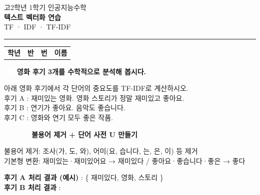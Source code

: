 \documentclass[a4paper,11pt]{article}
\begin{document}
\begin{center}
{\small\color{gray} 고2학년 1학기 인공지능수학}
\\[2mm]
{\LARGE\bfseries 텍스트 벡터화 연습}
\\[1mm]
{\normalsize\color{gray} TF · IDF · TF-IDF}
\end{center}
\vspace{-2mm}
\noindent\rule{\linewidth}{0.8pt}
\vspace{1mm}
\begin{tabular}{llll}
\textbf{학년} & \textbf{반} & \textbf{번} & \textbf{이름} \\
\end{tabular}
\par\vspace{2mm}
\noindent
\colorbox{badgegray}{\textcolor{white}{\small\bfseries 상황}}\enspace\textbf{영화 후기 3개를 수학적으로 분석해 봅시다.}
\vspace{1mm}
\begin{tcolorbox}[colback=white,colframe=black!70,boxrule=0.5pt,left=6pt,right=6pt,top=4pt,bottom=4pt]
아래 영화 후기에서 각 단어의 중요도를 TF-IDF로 계산하시오.\\[1mm]
\noindent 후기 A :  재미있는 영화. 영화 스토리가 정말 재미있고 좋아요.\\
\noindent 후기 B :  연기가 좋아요. 음악도 좋습니다.\\
\noindent 후기 C :  영화와 연기 모두 좋은 작품.\\
\end{tcolorbox}
\vspace{2mm}
\noindent
\colorbox{badgegray}{\textcolor{white}{\small\bfseries STEP 1}}\enspace\textbf{불용어 제거 + 단어 사전 U 만들기}
\par\vspace{1mm}
\begin{tcolorbox}[colback=stepbg,colframe=gray!50,boxrule=0.3pt,left=5pt,right=5pt,top=2pt,bottom=2pt]
\noindent\small 불용어 제거: 조사(가, 도, 와), 어미(요, 습니다, 는, 은, 이) 등 제거\\
\noindent\small 기본형 변환: 재미있는·재미있어요 → 재미있다  /  좋아요·좋습니다·좋은 → 좋다\\
\end{tcolorbox}
\vspace{1mm}
\noindent\textbf{후기 A 처리 결과 (예시)} : \enspace
\colorbox{stepbg}{\{ 재미있다, 영화, 스토리 \}}
\\[3pt]
\noindent\textbf{후기 B 처리 결과} : \enspace
\dotfill
\\[3pt]
\end{document}
